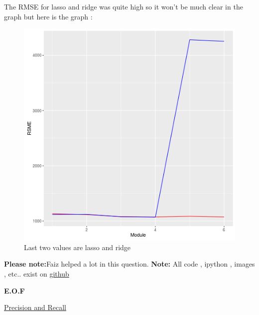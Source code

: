 \documentclass{article}
\begin{document}
The RMSE for lasso and ridge was quite high so it won't be much clear in the graph but here is the graph : \\
\begin{figure}[H]
\includegraphics[scale=1]{all_modules.png}
\caption{Last two values are lasso and ridge}
\end{figure}

\textbf{Please note:}Faiz helped a lot in this question.
\textbf{Note: }All code , ipython , images , etc.. exist on \href{https://github.com/aqeel13932/DM/tree/master/HW10}{github}
\begin{center}
\textbf{E.O.F}
\end{center}
\begin{thebibliography}{9}
	\href{https://en.wikipedia.org/wiki/Precision_and_recall}{Precision and Recall}
\end{thebibliography}
\end{document}
